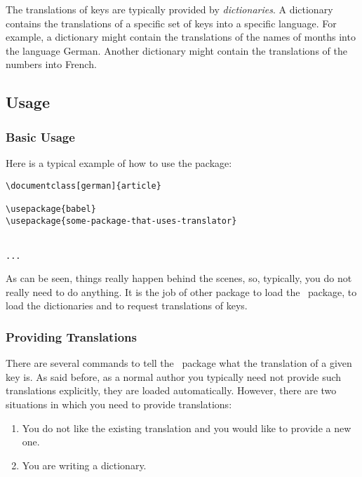 The translations of keys are typically provided by \emph{dictionaries}. A dictionary contains the translations of a specific set of keys into a specific language. For example, a dictionary might contain the translations of the names of months into the language German. Another dictionary might contain the translations of the numbers into French.


\subsection{Usage}

\subsubsection{Basic Usage}
\label{section-translator-basic-usage}

Here is a typical example of how to use the package:
\begin{verbatim}
\documentclass[german]{article}

\usepackage{babel}
\usepackage{some-package-that-uses-translator}


...

\end{verbatim}
As can be seen, things really happen behind the scenes, so, typically, you do not really need to do anything. It is the job of other package to load the \translatorname\ package, to load the dictionaries and to request translations of keys.

\subsubsection{Providing Translations}

There are several commands to tell the \translatorname\ package what the translation of a given key is. As said before, as a normal author you typically need not provide such translations explicitly, they are loaded automatically. However, there are two situations in which you need to provide translations:
\begin{enumerate}
\item
  You do not like the existing translation and you would like to provide a new one.
\item
  You are writing a dictionary.
\end{enumerate}

